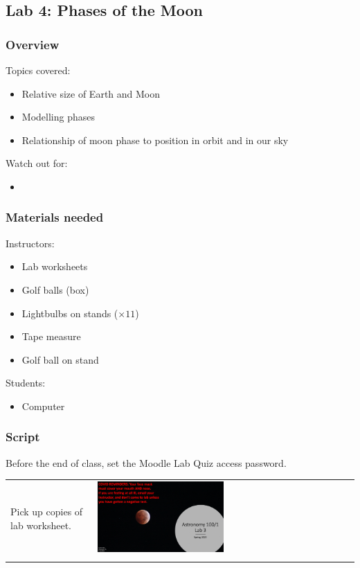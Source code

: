 \documentclass[12pt]{article}
\begin{document}
\newpage
\subsection{Lab 4: Phases of the Moon}

\subsubsection{Overview}

Topics covered:
\begin{itemize}
\item Relative size of Earth and Moon
\item Modelling phases
\item Relationship of moon phase to position in orbit and in our sky
\end{itemize}

\noindent
Watch out for:
\begin{itemize}
\item 
\end{itemize}


\subsubsection{Materials needed}

Instructors:
\begin{itemize}
\item Lab worksheets
\item Golf balls (box)
\item Lightbulbs on stands ($\times 11$)
\item Tape measure
\item Golf ball on stand
\end{itemize}

\noindent
Students:
\begin{itemize}
\item Computer
\end{itemize}


\subsubsection{Script}

Before the end of class, set the Moodle Lab Quiz access password.

\begin{longtable}{m{}m{}}
Pick up copies of lab worksheet. & \includegraphics[width=0.5\textwidth]{ppt/lab04/Slide1.jpeg}\\

\label{default}
\end{longtable}
\end{document}
